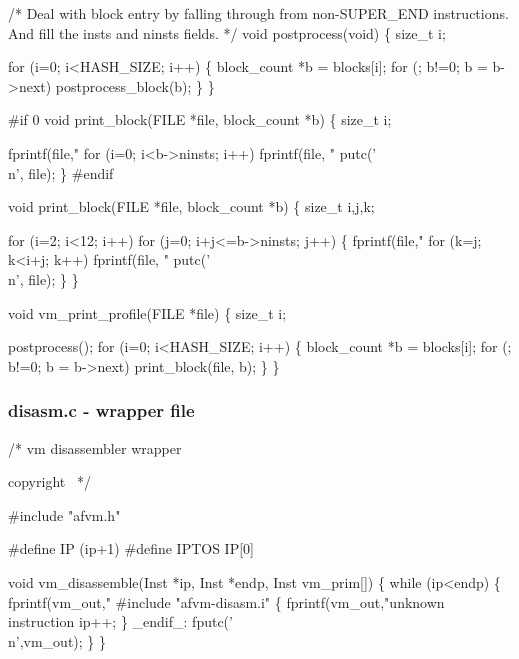\documentclass[10pt,english]{article}
\begin{document}
/* Deal with block entry by falling through from non-SUPER_END
   instructions.  And fill the insts and ninsts fields. */
void postprocess(void)
\{
  size_t i;

  for (i=0; i<HASH_SIZE; i++) \{
    block_count *b = blocks[i];
    for (; b!=0; b = b->next)
      postprocess_block(b);
   \}
\}

#if 0
void print_block(FILE *file, block_count *b)
\{
  size_t i;

  fprintf(file,"%
  for (i=0; i<b->ninsts; i++)
    fprintf(file, "%
  putc('\\n', file);
\}
#endif

void print_block(FILE *file, block_count *b)
\{
  size_t i,j,k;

  for (i=2; i<12; i++)
    for (j=0; i+j<=b->ninsts; j++) \{
      fprintf(file,"%
      for (k=j; k<i+j; k++)
        fprintf(file, "%
      putc('\\n', file);
    \}
\}

void vm_print_profile(FILE *file)
\{
  size_t i;

  postprocess();
  for (i=0; i<HASH_SIZE; i++) \{
    block_count *b = blocks[i];
    for (; b!=0; b = b->next)
      print_block(file, b);
   \}
\}
\nwendcode{}\nwdocspar


\subsubsection{disasm.c - wrapper file}

\nwenddocs{}\endmoddef
/* vm disassembler wrapper

\LA{}copyright~{\nwtagstyle{}}\RA{}
*/

#include "afvm.h"

#define IP (ip+1)
#define IPTOS IP[0]

void vm_disassemble(Inst *ip, Inst *endp, Inst vm_prim[])
\{
  while (ip<endp) \{
    fprintf(vm_out,"%
#include "afvm-disasm.i"
    \{
      fprintf(vm_out,"unknown instruction %
      ip++;
    \}
  _endif_:
    fputc('\\n',vm_out);
  \}
\}
\nwendcode{}\nwdocspar
\end{document}
